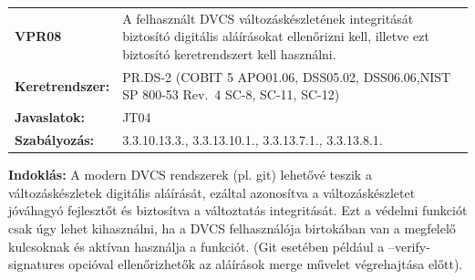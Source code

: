 \documentclass[12pt,magyar,a4paper,oneside]{scrreprt}
\begin{document}
\begin{longtable}[]{@{}ll@{}}
\toprule
\endhead
\begin{minipage}[t]{0.16\columnwidth}\raggedright
\textbf{VPR08}\strut
\end{minipage} & \begin{minipage}[t]{0.79\columnwidth}\raggedright
A felhasznált DVCS változáskészletének integritását biztosító digitális
aláírásokat ellenőrizni kell, illetve ezt biztosító keretrendszert kell
használni.\strut
\end{minipage}\tabularnewline
\begin{minipage}[t]{0.16\columnwidth}\raggedright
\textbf{Keretrendszer:}\strut
\end{minipage} & \begin{minipage}[t]{0.79\columnwidth}\raggedright
PR.DS-2 (COBIT 5 APO01.06, DSS05.02, DSS06.06,NIST SP 800-53 Rev.~4
SC-8, SC-11, SC-12)\strut
\end{minipage}\tabularnewline
\begin{minipage}[t]{0.16\columnwidth}\raggedright
\textbf{Javaslatok:}\strut
\end{minipage} & \begin{minipage}[t]{0.79\columnwidth}\raggedright
JT04\strut
\end{minipage}\tabularnewline
\begin{minipage}[t]{0.16\columnwidth}\raggedright
\textbf{Szabályozás:}\strut
\end{minipage} & \begin{minipage}[t]{0.79\columnwidth}\raggedright
3.3.10.13.3., 3.3.13.10.1., 3.3.13.7.1., 3.3.13.8.1.\strut
\end{minipage}\tabularnewline
\bottomrule
\end{longtable}

\textbf{Indoklás: } A modern DVCS rendszerek (pl. git) lehetővé teszik a
változáskészletek digitális aláírását, ezáltal azonosítva a
változáskészletet jóváhagyó fejlesztőt és biztosítva a változtatás
integritását. Ezt a védelmi funkciót csak úgy lehet kihasználni, ha a
DVCS felhasználója birtokában van a megfelelő kulcsoknak és aktívan
használja a funkciót. (Git esetében például a --verify-signatures
opcióval ellenőrizhetők az aláírások merge művelet végrehajtása előtt).
\end{document}
